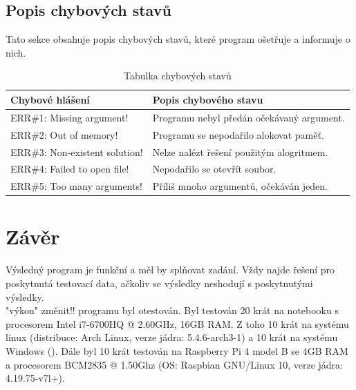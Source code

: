 \documentclass[12pt]{article}
\begin{document}
\subsection{Popis chybových stavů}
Tato sekce obsahuje popis chybových stavů, které program ošetřuje a informuje
o nich.
%
\begin{table}[H]
        \begin{tabular}{|l|p{6.35cm}|}
                \hline
                \bf Chybové hlášení & \bf Popis chybového stavu \\
                \hline
                ERR\#1: Missing argument! & Programu nebyl předán očekávaný
		argument.\\
		\hline
                ERR\#2: Out of memory! & Programu se nepodařilo alokovat
		paměť.\\
                \hline
                ERR\#3: Non-existent solution! & Nelze nalézt řešení použitým
		alogritmem.\\
                \hline
                ERR\#4: Failed to open file! & Nepodařilo se otevřít soubor.\\
                \hline
                ERR\#5: Too many arguments! & Příliš mnoho argumentů, očekáván
		jeden.\\
                \hline
        \end{tabular}
        \caption{Tabulka chybových stavů}
        \label{tab:err}
\end{table}
%
%
\section{Závěr}
%
Výsledný program je funkční a měl by splňovat zadání. Vždy najde řešení pro
poskytnutá testovací data, ačkoliv se výsledky neshodují s poskytnutými
výsledky.\\

"výkon" změnit!! programu byl otestován. Byl testován 20 krát na notebooku s procesorem
Intel i7-6700HQ @ 2.60GHz, 16GB RAM. Z toho 10 krát na systému linux (distribuce:
Arch Linux, verze jádra: 5.4.6-arch3-1) a 10 krát na systému Windows (). Dále byl
10 krát testován na Raspberry Pi 4 model B se 4GB RAM a procesorem 
BCM2835 @ 1.50Ghz (OS: Raspbian GNU/Linux 10, verze jádra: 4.19.75-v7l+).\\
\end{document}
